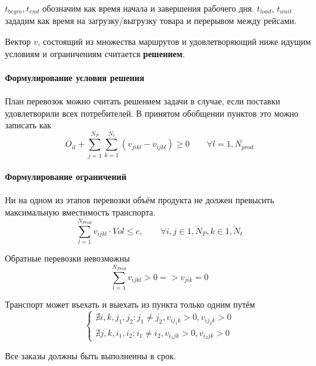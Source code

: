 	$t_{begin}, t_{end}$ обозначим как время начала и завершения рабочего дня. $t_{load}$, $t_{wait}$ зададим как время на загрузку/выгрузку товара и перерывом между рейсами.
	
	Вектор $v$, состоящий из множества маршрутов и удовлетворяющий ниже идущим условиям и ограничениям считается \textbf{решением}.
	
	\paragraph{Формулирование условия решения}    
	План перевозок можно считать решением задачи в случае, если поставки удовлетворили всех потребителей. В принятом обобщении пунктов это можно записать как
	\begin{equation}
		O_{il} + \sum_{j=1}^{N_P} \sum_{k=1}^{N_t} (v_{jikl} - v_{ijkl}) \ge 0 \qquad  \forall l = \overline{1, N_{prod}}
	\end{equation}
	
	\paragraph{Формулирование ограничений}     
	
	Ни на одном из этапов перевозки объём продукта не должен превысить максимальную вместимость транспорта.
	\begin{equation}
		\sum_{l=1}^{N_{Prod}} v_{ijkl} \cdot Vol \le c, \qquad \forall i, j \in \overline{1, N_P}, k \in \overline{1, N_t}
	\end{equation}

	Обратные перевозки невозможны
	\begin{equation}
		\sum_{l=1}^{N_{Prod}} v_{ijkl} > 0 => v_{jik} = 0
	\end{equation}

	Транспорт может въехать и выехать из пункта только одним путём
	\begin{equation}
		\left\{
		\begin{array}{ccc}
			\nexists i, k, j_1, j_2: j_1 \ne j_2, v_{ij_1k} > 0, v_{ij_2k} > 0 \\
			\nexists j, k, i_1, i_2: i_1 \ne i_2, v_{i_1jk} > 0, v_{i_2jk} > 0 
		\end{array}
		\right.
	\end{equation}

	Все заказы должны быть выполненны в срок. 
	
